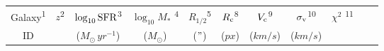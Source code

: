 \newpage
\begin{table}[htbp]

	\centering

	\begin{tabular}{c c c c c c c c c c c}

\hline
Galaxy\textsuperscript{1} & $z$\textsuperscript{2} & $\log_{10} \rm{SFR}$\textsuperscript{3} & $\log_{10} M_{*}$ \textsuperscript{4} & $R_{1/2}$\textsuperscript{5} & $R_{\rm{c}}$\textsuperscript{8} & $V_{\rm{c}}$\textsuperscript{9} & $\sigma_{\rm{v}}$\textsuperscript{10} & $\chi^2$ \textsuperscript{11} \\
ID & & ($\si{M_{\odot} \, yr^{-1}}$) & ($\si{M_{\odot}}$) & ($\si{"}$) & ($\si{px}$) & ($\si{km/s}$) & ($\si{km/s}$) & \\
\hline




\end{tabular}
\end{table}
